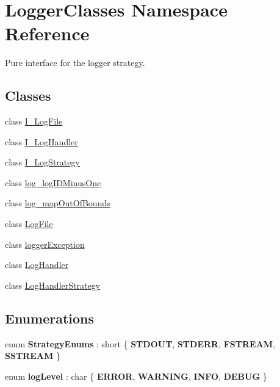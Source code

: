 \hypertarget{namespaceLoggerClasses}{}\section{Logger\+Classes Namespace Reference}
\label{namespaceLoggerClasses}


Pure interface for the logger strategy.  


\subsection*{Classes}
\begin{DoxyCompactItemize}
\item 
class \mbox{\hyperlink{classLoggerClasses_1_1I__LogFile}{I\+\_\+\+Log\+File}}
\item 
class \mbox{\hyperlink{classLoggerClasses_1_1I__LogHandler}{I\+\_\+\+Log\+Handler}}
\item 
class \mbox{\hyperlink{classLoggerClasses_1_1I__LogStrategy}{I\+\_\+\+Log\+Strategy}}
\item 
class \mbox{\hyperlink{classLoggerClasses_1_1log__logIDMinusOne}{log\+\_\+log\+I\+D\+Minus\+One}}
\item 
class \mbox{\hyperlink{classLoggerClasses_1_1log__mapOutOfBounds}{log\+\_\+map\+Out\+Of\+Bounds}}
\item 
class \mbox{\hyperlink{classLoggerClasses_1_1LogFile}{Log\+File}}
\item 
class \mbox{\hyperlink{classLoggerClasses_1_1loggerException}{logger\+Exception}}
\item 
class \mbox{\hyperlink{classLoggerClasses_1_1LogHandler}{Log\+Handler}}
\item 
class \mbox{\hyperlink{classLoggerClasses_1_1LogHandlerStrategy}{Log\+Handler\+Strategy}}
\end{DoxyCompactItemize}
\subsection*{Enumerations}
\begin{DoxyCompactItemize}
\item 
\mbox{\label{namespaceLoggerClasses_a6e289d81f2f68c484f26acc38077b0cf}} 
enum {\bfseries Strategy\+Enums} \+: short \{ {\bfseries S\+T\+D\+O\+UT}, 
{\bfseries S\+T\+D\+E\+RR}, 
{\bfseries F\+S\+T\+R\+E\+AM}, 
{\bfseries S\+S\+T\+R\+E\+AM}
 \}
\item 
\mbox{\label{namespaceLoggerClasses_aa5f483a2b3a6a6cc37691b38a051f135}} 
enum {\bfseries log\+Level} \+: char \{ {\bfseries E\+R\+R\+OR}, 
{\bfseries W\+A\+R\+N\+I\+NG}, 
{\bfseries I\+N\+FO}, 
{\bfseries D\+E\+B\+UG}
 \}
\end{DoxyCompactItemize}



